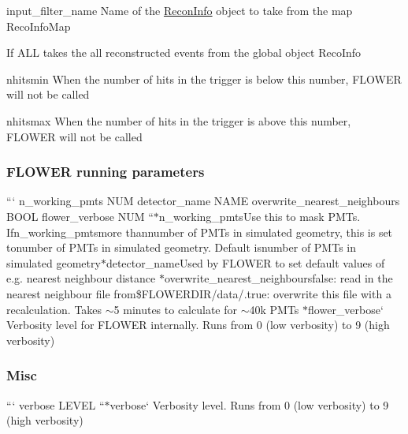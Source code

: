 \begin{DoxyItemize}
\item {\ttfamily input\-\_\-filter\-\_\-name} Name of the {\ttfamily \hyperlink{classReconInfo}{Recon\-Info}} object to take from the map {\ttfamily Reco\-Info\-Map}
\begin{DoxyItemize}
\item If A\-L\-L takes the all reconstructed events from the global object {\ttfamily Reco\-Info}
\end{DoxyItemize}
\item {\ttfamily nhitsmin} When the number of hits in the trigger is below this number, F\-L\-O\-W\-E\-R will not be called
\item {\ttfamily nhitsmax} When the number of hits in the trigger is above this number, F\-L\-O\-W\-E\-R will not be called
\end{DoxyItemize}

\subsubsection*{F\-L\-O\-W\-E\-R running parameters}

``` n\-\_\-working\-\_\-pmts N\-U\-M detector\-\_\-name N\-A\-M\-E overwrite\-\_\-nearest\-\_\-neighbours B\-O\-O\-L flower\-\_\-verbose N\-U\-M ``{\ttfamily  $\ast$}n\-\_\-working\-\_\-pmts{\ttfamily Use this to mask P\-M\-Ts. If}n\-\_\-working\-\_\-pmts{\ttfamily more than}number of P\-M\-Ts in simulated geometry{\ttfamily , this is set to}number of P\-M\-Ts in simulated geometry{\ttfamily . Default is}number of P\-M\-Ts in simulated geometry{\ttfamily  $\ast$}detector\-\_\-name{\ttfamily Used by F\-L\-O\-W\-E\-R to set default values of e.\-g. nearest neighbour distance $\ast$}overwrite\-\_\-nearest\-\_\-neighboursfalse{\ttfamily \-: read in the nearest neighbour file from}\$\-F\-L\-O\-W\-E\-R\-D\-I\-R/data/{\ttfamily .}true{\ttfamily \-: overwrite this file with a recalculation. Takes $\sim$5 minutes to calculate for $\sim$40k P\-M\-Ts $\ast$}flower\-\_\-verbose` Verbosity level for F\-L\-O\-W\-E\-R internally. Runs from 0 (low verbosity) to 9 (high verbosity)

\subsubsection*{Misc}

``` verbose L\-E\-V\-E\-L ``{\ttfamily  $\ast$}verbose` Verbosity level. Runs from 0 (low verbosity) to 9 (high verbosity) 
